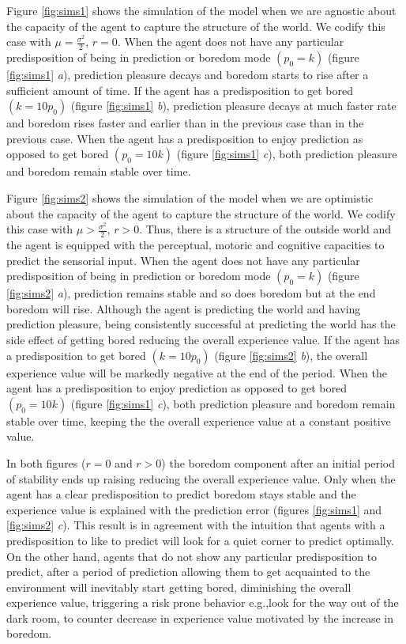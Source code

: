\documentclass[11pt,twocolumn]{article}
\begin{document}
Figure \ref{fig:sims1} shows the simulation of the model when we are agnostic about the capacity  of the agent to capture the structure of the world. We codify this case with $ \mu = \frac{\sigma ^2}{2}$, $r=0$. When the agent does not have any particular predisposition of being in prediction or boredom mode $( p_0 = k )$ (figure \ref{fig:sims1} \emph{a}), prediction pleasure decays and boredom starts to rise after a sufficient amount of time. If the agent has a predisposition to  get bored $( k = 10p_0 )$ (figure \ref{fig:sims1} \emph{b}), prediction pleasure decays at much faster rate and boredom rises faster and earlier than in the previous case than in the previous case. When the agent has a predisposition to enjoy prediction as opposed to get bored $( p_0 = 10k )$ (figure \ref{fig:sims1} \emph{c}), both prediction pleasure and boredom remain stable over time.

Figure \ref{fig:sims2} shows the simulation of the model when we are optimistic about the capacity  of the agent to capture the structure of the world. We codify this case with $ \mu > \frac{\sigma ^2}{2}$, $r>0$. Thus, there  is a structure of the outside world and the agent is equipped with the perceptual, motoric and cognitive capacities to predict the sensorial input.
When the agent does not have any particular predisposition of being in prediction or boredom mode $( p_0 = k )$ (figure \ref{fig:sims2} \emph{a}), prediction remains stable and so does boredom but at the end boredom will rise. Although the agent is predicting the world and having prediction pleasure, being consistently successful at predicting the world has the side effect of getting bored reducing the overall experience value. 
If the agent has a predisposition to  get bored $( k = 10p_0 )$ (figure \ref{fig:sims2} \emph{b}), the overall experience value will be markedly negative at the end of the period. When the agent has a predisposition to enjoy prediction as opposed to get bored $( p_0 = 10k )$ (figure \ref{fig:sims1} \emph{c}), both prediction pleasure and boredom remain stable over time, keeping the the overall experience value at a constant positive value.

In both figures ($r=0$ and $r>0$) the boredom component after an initial period of stability ends up raising reducing the overall experience value. Only when the agent has a clear predisposition to predict boredom stays stable and the experience value is explained with the prediction error (figures \ref{fig:sims1} and \ref{fig:sims2} \emph{c}). This result is in agreement with the intuition that agents  with a predisposition to like to predict will look for a quiet corner to predict optimally. On the other hand, agents that do not show any particular predisposition to predict, after a period of prediction allowing them to get acquainted  to the environment will inevitably start getting bored, diminishing the overall experience value, triggering a risk prone behavior e.g.,look for the way out of the dark room, to counter decrease in experience value motivated by the increase in boredom. 
\end{document}

